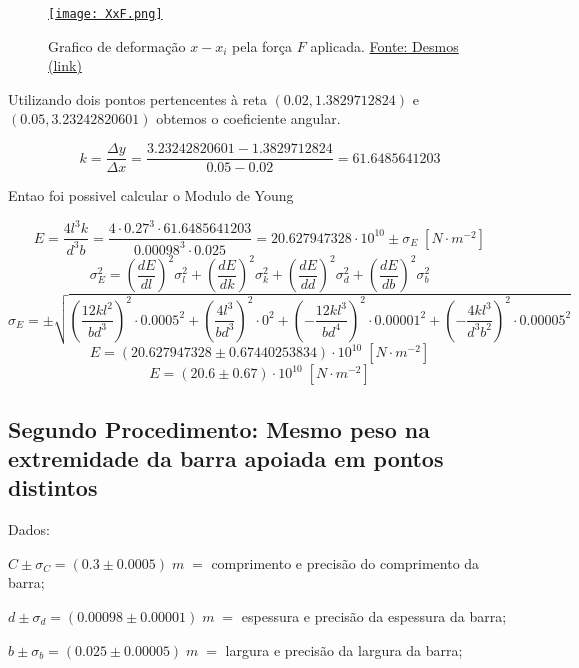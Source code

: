\documentclass{article}
\begin{document}
\begin{figure}[!ht]
    \centering
    \href{https://www.desmos.com/calculator/lwhpg1by6v}{\texttt{[image: XxF.png]}}
    \caption{Grafico de deformação $x - x_i$ pela força $F$ aplicada. \href{https://www.desmos.com/calculator/lwhpg1by6v}{Fonte: Desmos (link)}}
    \label{gra:XxF}
\end{figure}

Utilizando dois pontos pertencentes à reta $(0.02, 1.3829712824)$ e $(0.05, 3.23242820601)$ obtemos o coeficiente angular.

\[k = \frac{\Delta y}{\Delta x} = \frac{3.23242820601-1.3829712824}{0.05-0.02} = 61.6485641203\]

Entao foi possivel calcular o Modulo de Young

\[E = \frac{4l^3k}{d^3b} = \frac{4\cdot{0.27}^3\cdot61.6485641203}{{0.00098}^3\cdot0.025} = 20.627947328\cdot{10}^{10}\pm\sigma_E\;\left[N\cdot m^{-2}\right]\]
\[\sigma_E^2 = \left(\frac{dE}{dl}\right)^2\sigma_l^2 + 
\left(\frac{dE}{dk}\right)^2\sigma_k^2 + 
\left(\frac{dE}{dd}\right)^2\sigma_d^2 + 
\left(\frac{dE}{db}\right)^2\sigma_b^2\]
\[\sigma_E = \pm\sqrt{
\left(\frac{12kl^2}{bd^3}\right)^2\cdot0.0005^2 +
\left(\frac{4l^3}{bd^3}\right)^2\cdot0^2 + 
\left(-\frac{12kl^3}{bd^4}\right)^2\cdot0.00001^2 + 
\left(-\frac{4kl^3}{d^3b^2}\right)^2\cdot0.00005^2
}\]
\[E = \left(20.627947328\pm0.67440253834\right)\cdot{10}^{10}\;\left[N\cdot m^{-2}\right]\]
\[E = \left(20.6\pm0.67\right)\cdot{10}^{10}\;\left[N\cdot m^{-2}\right]\]

\subsection{Segundo Procedimento: Mesmo peso na extremidade da barra apoiada em pontos distintos}

Dados:

$C\pm\sigma_C = (0.3\pm0.0005)\;m\;=$ comprimento e precisão do comprimento da barra;

$d\pm\sigma_d = (0.00098\pm0.00001)\;m\;=$ espessura e precisão da espessura da barra;

$b\pm\sigma_b = (0.025\pm0.00005)\;m\;=$ largura e precisão da largura da barra;
\end{document}

